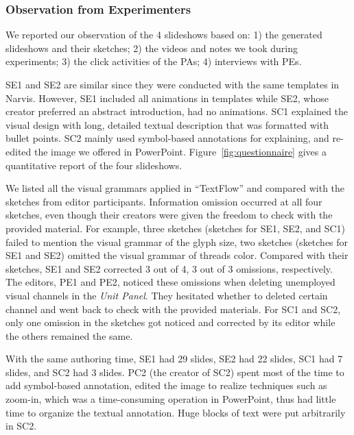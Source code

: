 \subsubsection{Observation from Experimenters}

We reported our observation of the 4 slideshows based on: 1) the generated slideshows and their sketches; 2) the videos and notes we took during experiments; 3) the click activities of the PAs; 4) interviews with PEs.

SE1 and SE2 are similar since they were conducted with the same templates in Narvis. However, SE1 included all animations in templates while SE2, whose creator preferred an abstract introduction, had no animations. 
SC1 explained the visual design with long, detailed textual description that was formatted with bullet points. SC2 mainly used symbol-based annotations for explaining, and re-edited the image we offered in PowerPoint. Figure~\ref{fig:questionnaire} gives a quantitative report of the four slideshows.

We listed all the visual grammars applied in ``TextFlow'' and compared with the sketches from editor participants. Information omission occurred at all four sketches, even though their creators were given the freedom to check with the provided material. For example, three sketches (sketches for SE1, SE2, and SC1) failed to mention the visual grammar of the glyph size, two sketches (sketches for SE1 and SE2) omitted the visual grammar of threads color. 
Compared with their sketches, SE1 and SE2 corrected 3 out of 4, 3 out of 3 omissions, respectively. The editors, PE1 and PE2, noticed these omissions when deleting unemployed visual channels in the \textit{Unit Panel}. They hesitated whether to deleted certain channel and went back to check with the provided materials.   
For SC1 and SC2, only one omission in the sketches got noticed and corrected by its editor while the others remained the same. 

With the same authoring time, SE1 had 29 slides, SE2 had 22 slides, SC1 had 7 slides, and SC2 had 3 slides. PC2 (the creator of SC2) spent most of the time to add symbol-based annotation, edited the image to realize techniques such as zoom-in, which was a time-consuming operation in PowerPoint, thus had little time to organize the textual annotation. Huge blocks of text were put arbitrarily in SC2.



